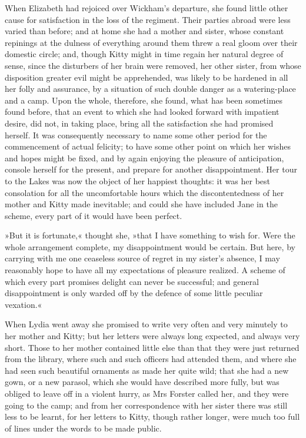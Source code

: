 When Elizabeth had rejoiced over Wickham's departure, she found little other cause for satisfaction in the loss of the regiment. Their parties abroad were less varied than before; and at home she had a mother and sister, whose constant repinings at the dulness of everything around them threw a real gloom over their domestic circle; and, though Kitty might in time regain her natural degree of sense, since the disturbers of her brain were removed, her other sister, from whose disposition greater evil might be apprehended, was likely to be hardened in all her folly and assurance, by a situation of such double danger as a watering-place and a camp. Upon the whole, therefore, she found, what has been sometimes found before, that an event to which she had looked forward with impatient desire, did not, in taking place, bring all the satisfaction she had promised herself. It was consequently necessary to name some other period for the commencement of actual felicity; to have some other point on which her wishes and hopes might be fixed, and by again enjoying the pleasure of anticipation, console herself for the present, and prepare for another disappointment. Her tour to the Lakes was now the object of her happiest thoughts: it was her best consolation for all the uncomfortable hours which the discontentedness of her mother and Kitty made inevitable; and could she have included Jane in the scheme, every part of it would have been perfect.

»But it is fortunate,« thought she, »that I have something to wish for. Were the whole arrangement complete, my disappointment would be certain. But here, by carrying with me one ceaseless source of regret in my sister's absence, I may reasonably hope to have all my expectations of pleasure realized. A scheme of which every part promises delight can never be successful; and general disappointment is only warded off by the defence of some little peculiar vexation.«

When Lydia went away she promised to write very often and very minutely to her mother and Kitty; but her letters were always long expected, and always very short. Those to her mother contained little else than that they were just returned from the library, where such and such officers had attended them, and where she had seen such beautiful ornaments as made her quite wild; that she had a new gown, or a new parasol, which she would have described more fully, but was obliged to leave off in a violent hurry, as Mrs Forster called her, and they were going to the camp; and from her correspondence with her sister there was still less to be learnt, for her letters to Kitty, though rather longer, were much too full of lines under the words to be made public.

